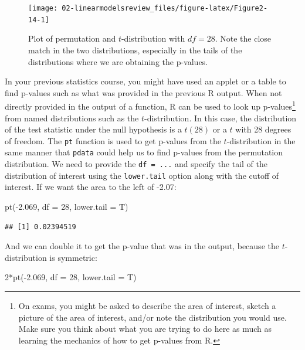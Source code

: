 \documentclass[
]{book}
\newenvironment{Shaded}{\begin{snugshade}}{\end{snugshade}}
\newcommand{\AttributeTok}[1]{\textcolor[rgb]{0.77,0.63,0.00}{#1}}
\newcommand{\DecValTok}[1]{\textcolor[rgb]{0.00,0.00,0.81}{#1}}
\newcommand{\FloatTok}[1]{\textcolor[rgb]{0.00,0.00,0.81}{#1}}
\newcommand{\FunctionTok}[1]{\textcolor[rgb]{0.00,0.00,0.00}{#1}}
\newcommand{\NormalTok}[1]{#1}
\newcommand{\SpecialCharTok}[1]{\textcolor[rgb]{0.00,0.00,0.00}{#1}}
\begin{document}
\begin{figure}[ht!]

{\centering \texttt{[image: 02-linearmodelsreview\_files/figure-latex/Figure2-14-1]} 

}

\caption{Plot of permutation and \(t\)-distribution with \(df = 28\). Note the close match in the two distributions, especially in the tails of the distributions where we are obtaining the p-values.}\label{fig:Figure2-14}
\end{figure}

\indent In your previous statistics course, you might have used an applet or
a table to find p-values such as what was provided in the previous R output.
When not directly provided in the output of a function, R can be used to look up
p-values\footnote{On exams, you might be asked to describe the area of interest, sketch a
  picture of the area of interest, and/or note the distribution you would use. Make sure you think about what you are trying to do here as much as learning the mechanics of how to get p-values from R.} from
named distributions such as the \(t\)-distribution. In this case, the distribution
of the test statistic under the null hypothesis is a \(t(28)\) or a \(t\) with 28
degrees of freedom. The \texttt{pt} function is used to get p-values from the
\(t\)-distribution in the same manner that \texttt{pdata} could help us to find p-values
from the permutation distribution.
We need to provide the \texttt{df\ =\ ...} and specify
the tail of the distribution of interest using the \texttt{lower.tail} option along
with the cutoff of interest. If we want the area to the left of -2.07:

\begin{Shaded}
\begin{Highlighting}[]
\FunctionTok{pt}\NormalTok{(}\SpecialCharTok{{-}}\FloatTok{2.069}\NormalTok{, }\AttributeTok{df =} \DecValTok{28}\NormalTok{, }\AttributeTok{lower.tail =}\NormalTok{ T)}
\end{Highlighting}
\end{Shaded}

\begin{verbatim}
## [1] 0.02394519
\end{verbatim}

And we can double it to get the p-value that was in the output, because
the \(t\)-distribution is symmetric:

\begin{Shaded}
\begin{Highlighting}[]
\DecValTok{2}\SpecialCharTok{*}\FunctionTok{pt}\NormalTok{(}\SpecialCharTok{{-}}\FloatTok{2.069}\NormalTok{, }\AttributeTok{df =} \DecValTok{28}\NormalTok{, }\AttributeTok{lower.tail =}\NormalTok{ T)}
\end{Highlighting}
\end{Shaded}
\end{document}
